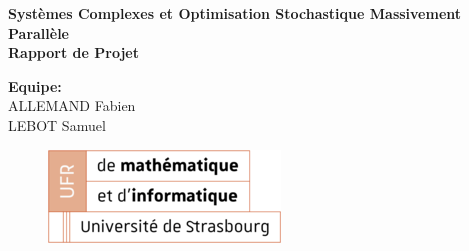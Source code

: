 \documentclass{article}
\begin{document}
\thispagestyle{empty}
\addtocounter{page}{-1}
\begin{center}
	\baselineskip=50pt
	\vspace*{1cm}
	\textbf{{\Huge Systèmes Complexes et Optimisation Stochastique Massivement Parallèle}}\\
	\vspace*{0.25cm}
	\textbf{{\Huge Rapport de Projet}}\\
	\vspace*{0.25cm}
	\begin{minipage}[c]{.46\linewidth}
        \centering
        \textbf{Equipe:}\\
		ALLEMAND Fabien\\
        LEBOT Samuel
    \end{minipage}
\end{center}
\vspace{0.1cm}

\begin{figure}[H]
\centering
\centerline{\includegraphics[scale=1.]{img/logo_UFR_2.png}}
\end{figure}

\newpage
\tableofcontents

\newpage
\listoffigures

\newpage


\newpage






\newpage

\end{document}

